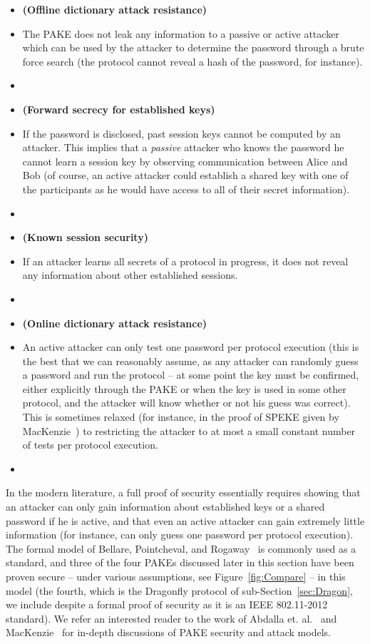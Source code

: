 \documentclass{amsart}
\theoremstyle{remark}
\begin{document}
\begin{itemize}
 \item[] \textbf{(Offline dictionary attack resistance)}
 \item[] The PAKE does not leak any information to a passive or active attacker which can be 
 used by the attacker to determine the password through a brute force search (the protocol 
 cannot reveal a hash of the password, for instance).
 \item[]
 \item[] \textbf{(Forward secrecy for established keys)}
 \item[] If the password is disclosed, past session keys cannot be computed by an attacker.  
 This implies that a \emph{passive} attacker who knows the password he cannot learn a session 
 key by observing communication between Alice and Bob (of course, an active attacker could 
 establish a shared key with one of the participants as he would have access to all of their 
 secret information).
 \item[]
 \item[] \textbf{(Known session security)}
 \item[] If an attacker learns all secrets of a protocol in progress, it does not reveal 
 any information about other established sessions.
  \item[]
 \item[] \textbf{(Online dictionary attack resistance)}
 \item[] An active attacker can only test one password per protocol execution (this is the 
 best that we can reasonably assume, as any attacker can randomly guess a password and 
 run the protocol -- at some point the key must be confirmed, either explicitly through the 
 PAKE or when the key is used in some other protocol, and the attacker will know whether or
 not his guess was correct).  This is sometimes relaxed (for instance, in the proof of SPEKE given
 by MacKenzie~\cite{Mac01}) to restricting the attacker to at most a small constant number of tests
 per protocol execution.
\item[]
\end{itemize}

 In the modern literature, a full proof of security essentially requires showing that an attacker
 can only gain information about established keys or a shared password if he is active, and that even an active
 attacker can gain extremely little information (for instance, can only guess one password per protocol execution).
 The formal model of Bellare, Pointcheval, and Rogaway~\cite{BePoRo00} is commonly used as a standard, and three of the 
 four PAKEs discussed later in this section have been proven secure -- under various assumptions, see Figure~\ref{fig:Compare} -- in
 this model (the fourth, which is the Dragonfly protocol of sub-Section~\ref{sec:Dragon}, we include despite a formal 
 proof of security as it is an IEEE 802.11-2012 standard).  We refer an interested reader to the work of 
 Abdalla et. al.~\cite{AbdBenMac15} and MacKenzie~\cite{Mac02} for in-depth discussions of PAKE security and attack models.
\end{document}
